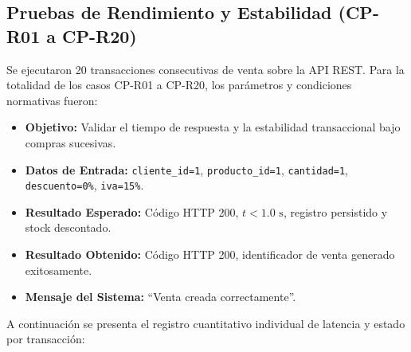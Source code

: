 \documentclass{article}
\begin{document}
\subsection{Pruebas de Rendimiento y Estabilidad (CP-R01 a CP-R20)}
Se ejecutaron 20 transacciones consecutivas de venta sobre la API REST. Para la totalidad de los casos CP-R01 a CP-R20, los parámetros y condiciones normativas fueron:
\begin{itemize}
\item \textbf{Objetivo:} Validar el tiempo de respuesta y la estabilidad transaccional bajo compras sucesivas.
\item \textbf{Datos de Entrada:} \texttt{cliente\_id=1}, \texttt{producto\_id=1}, \texttt{cantidad=1}, \texttt{descuento=0\%}, \texttt{iva=15\%}.
\item \textbf{Resultado Esperado:} Código HTTP 200, $t < 1.0\text{ s}$, registro persistido y stock descontado.
\item \textbf{Resultado Obtenido:} Código HTTP 200, identificador de venta generado exitosamente.
\item \textbf{Mensaje del Sistema:} ``Venta creada correctamente''.
\end{itemize}

A continuación se presenta el registro cuantitativo individual de latencia y estado por transacción:
\end{document}
